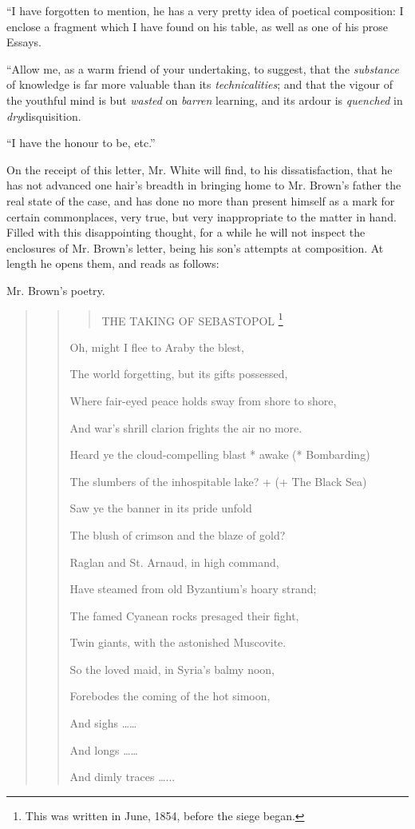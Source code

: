 ``I have forgotten to mention, he has a very pretty idea of
poetical composition: I enclose a fragment which I have found on his
table, as well as one of his prose Essays.

``Allow me, as a warm friend of your undertaking, to suggest,
that the \emph{substance} of knowledge is far more valuable than its \emph{technicalities};
and that the vigour of the youthful mind is but \emph{wasted} on \emph{barren}
learning, and its ardour is \emph{quenched} in \emph{dry}disquisition.

``I have the honour to be, etc.''

On the receipt of this letter, Mr. White will find, to his
dissatisfaction, that he has not advanced one hair's breadth in
bringing home to Mr. Brown's father the real state of the case, and
has done no more than present himself as a mark for certain
commonplaces, very true, but very inappropriate to the matter in hand.
Filled with this disappointing thought, for a while he will not
inspect the enclosures of Mr. Brown's letter, being his son's attempts
at composition. At length he opens them, and reads as follows:

Mr. Brown's poetry.

\begin{quote}

\begin{quote}

\begin{quote}

THE TAKING OF SEBASTOPOL \footnote{This was written in June, 1854, before the siege began.}

\end{quote}

Oh, might I flee to Araby the blest,

The world forgetting, but its gifts possessed,

Where fair-eyed peace holds sway from shore to shore,

And war's shrill clarion frights the air no more.

Heard ye the cloud-compelling blast * awake (*
Bombarding)

The slumbers of the inhospitable lake? + (+
The Black Sea)

Saw ye the banner in its pride unfold

The blush of crimson and the blaze of gold?

Raglan and St. Arnaud, in high command,

Have steamed from old Byzantium's hoary strand;

The famed Cyanean rocks presaged their fight,

Twin giants, with the astonished Muscovite.

So the loved maid, in Syria's balmy noon,

Forebodes the coming of the hot simoon,

And sighs ……

And longs ……

And dimly traces …...

\end{quote}

\end{quote}

